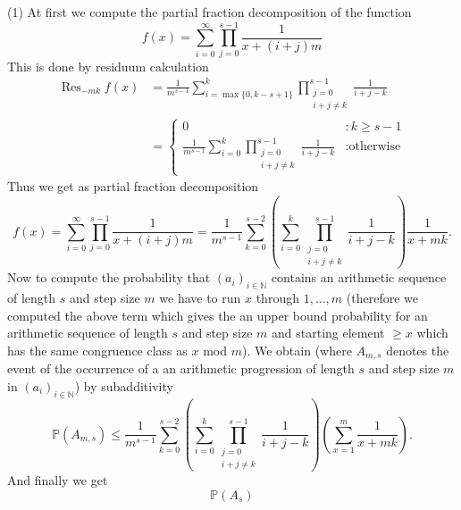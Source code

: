 \documentclass[10pt,a4paper]{article}
\newcommand{\nats}{\mathbb{N}}
\newcommand{\Res}{\operatorname{Res}}
\newcommand{\prob}{\mathbb{P}}
\begin{document}
(1) At first we compute the partial fraction decomposition of the function
\begin{equation}
f(x)=\sum_{i=0}^\infty{\prod_{j=0}^{s-1}{\frac{1}{x+(i+j)m}}}
\end{equation}
This is done by residuum calculation
\begin{align}
\Res_{-mk}{f(x)} & = \frac{1}{m^{s-1}}\sum_{i=\max\{0,k-s+1\}}^{k}{\prod_{\substack{j=0\\ i+j\neq k}}^{s-1}{\frac{1}{i+j-k}}}\\
& = \begin{cases} 
0 &: k\geq s-1\\
\frac{1}{m^{s-1}}\sum\limits_{i=0}^{k}{\prod\limits_{\substack{j=0\\ i+j\neq k}}^{s-1}{\frac{1}{i+j-k}}} &: \text{otherwise}
\end{cases}
\end{align}
Thus we get as partial fraction decomposition
\begin{equation}
f(x)=\sum_{i=0}^\infty{\prod_{j=0}^{s-1}{\frac{1}{x+(i+j)m}}}=\frac{1}{m^{s-1}}\sum_{k=0}^{s-2}{\left(\sum\limits_{i=0}^{k}{\prod\limits_{\substack{j=0\\ i+j\neq k}}^{s-1}{\frac{1}{i+j-k}}}\right)\frac{1}{x+mk}}\text{.}
\end{equation}
Now to compute the probability that $(a_i)_{i\in\nats}$ contains an arithmetic sequence of length $s$ and step size $m$ we have to run $x$ through $1,\ldots,m$ (therefore we computed the above term which gives the an upper bound probability for an arithmetic sequence of length $s$ and step size $m$ and starting element $\geq x$ which has the same congruence class as $x$ mod $m$). We obtain (where $A_{m,s}$ denotes the event of the occurrence of a an arithmetic progression of length $s$ and step size $m$ in $(a_i)_{i\in\nats}$) by subadditivity
\begin{equation}
\prob(A_{m,s})\leq\frac{1}{m^{s-1}}\sum_{k=0}^{s-2}{\left(\sum\limits_{i=0}^{k}{\prod\limits_{\substack{j=0\\ i+j\neq k}}^{s-1}{\frac{1}{i+j-k}}}\right)\left(\sum_{x=1}^m\frac{1}{x+mk}\right)}\text{.}
\end{equation}
And finally we get
\begin{equation}
\prob(A_s)
\end{equation}
\end{document}
